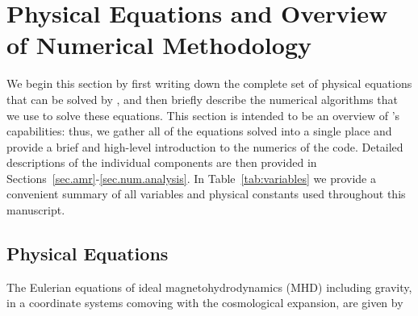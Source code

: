 

\section{Physical Equations and Overview of Numerical Methodology}
\label{sec.overview}

We begin this section by first writing down the complete set of
physical equations that can be solved by \enzo, and then briefly
describe the numerical algorithms that we use to solve these
equations.  This section is intended to be an overview of
\enzo's capabilities: thus, we gather all of the equations
solved into a single place and provide a brief and high-level
introduction to the numerics of the code.  Detailed descriptions of
the individual components are then provided in
Sections~\ref{sec.amr}-\ref{sec.num.analysis}. In
Table~\ref{tab:variables} we provide a convenient summary of all
variables and physical constants used throughout this manuscript.




\subsection{Physical Equations}
\label{sec.equations}



The Eulerian equations of ideal magnetohydrodynamics (MHD) including
gravity, in a coordinate systems comoving with the cosmological
expansion, are given by

